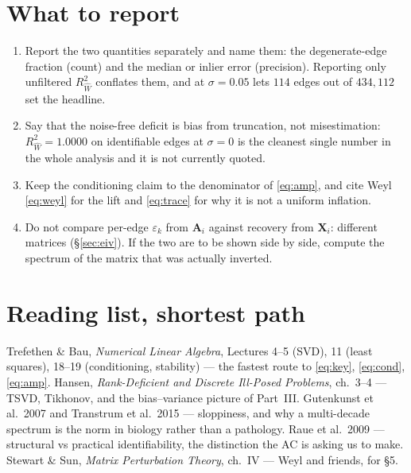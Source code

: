 \documentclass[11pt]{article}
\newcommand{\Mat}[1]{\mathbf{#1}}
\newcommand{\A}{\Mat{A}}
\newcommand{\Rw}{R^2_{\widehat W}}
\newcommand{\eps}{\varepsilon}
\begin{document}
\section{What to report}

\begin{enumerate}
\item Report the two quantities separately and name them: the degenerate-edge
fraction (count) and the median or inlier error (precision). Reporting only
unfiltered $\Rw$ conflates them, and at $\sigma = 0.05$ lets $114$ edges out of
$434{,}112$ set the headline.
\item Say that the noise-free deficit is bias from truncation, not
misestimation: $\Rw = 1.0000$ on identifiable edges at $\sigma = 0$ is the
cleanest single number in the whole analysis and it is not currently quoted.
\item Keep the conditioning claim to the denominator of \eqref{eq:amp}, and cite
Weyl \eqref{eq:weyl} for the lift and \eqref{eq:trace} for why it is not a
uniform inflation.
\item Do not compare per-edge $\eps_k$ from $\A_i$ against recovery from
$\Mat X_i$: different matrices (§\ref{sec:eiv}). If the two are to be shown side
by side, compute the spectrum of the matrix that was actually inverted.
\end{enumerate}

\section*{Reading list, shortest path}
Trefethen \& Bau, \emph{Numerical Linear Algebra}, Lectures 4--5 (SVD),
11 (least squares), 18--19 (conditioning, stability) --- the fastest route to
\eqref{eq:key}, \eqref{eq:cond}, \eqref{eq:amp}.
Hansen, \emph{Rank-Deficient and Discrete Ill-Posed Problems}, ch.~3--4 ---
TSVD, Tikhonov, and the bias--variance picture of Part~III.
Gutenkunst et al.\ 2007 and Transtrum et al.\ 2015 --- sloppiness, and why a
multi-decade spectrum is the norm in biology rather than a pathology.
Raue et al.\ 2009 --- structural vs practical identifiability, the distinction
the AC is asking us to make.
Stewart \& Sun, \emph{Matrix Perturbation Theory}, ch.~IV --- Weyl and
friends, for §5.
\end{document}
